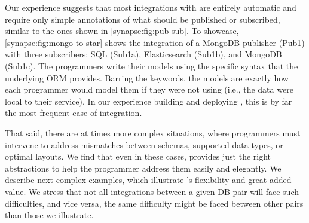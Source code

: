   Our experience suggests that most
integrations with \synapse are entirely automatic and require only simple
annotations of what should be published or subscribed, similar to the ones shown
in \F\ref{synapse:fig:pub-sub}.  To showcase, \F\ref{synapse:fig:mongo-to-star} shows the
integration of a MongoDB publisher (Pub1) with three
subscribers: SQL (Sub1a), Elasticsearch (Sub1b), and
MongoDB (Sub1c). The programmers write their models using
the specific syntax that the underlying ORM
provides.  Barring the {} keywords, the
models are exactly how each programmer would model them if they were not using
\synapse (i.e., the data were local to their service).  In our experience
building and deploying \synapse, this is by far the most
frequent case of integration.

That said, there are at times more complex situations, where programmers must
intervene to address mismatches between schemas, supported data types, or
optimal layouts.  We find that even in these cases, \synapse provides just the
right abstractions to help the programmer address them easily and elegantly.
We describe next complex examples, which illustrate \synapse's flexibility
and great added value.  We stress that not all integrations between a given DB
pair will face such difficulties, and vice versa, the same difficulty might be
faced between other pairs than those we illustrate.

